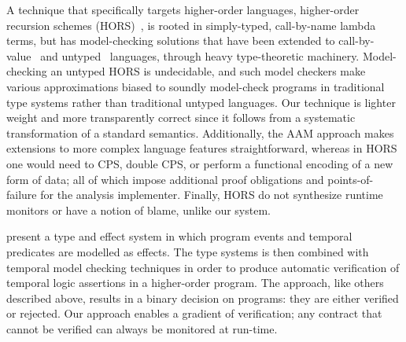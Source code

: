 A technique that specifically targets higher-order languages, higher-order recursion schemes (HORS)~\citep{ianjohnson:Knapik:2002:HPT:646794.704852}, is rooted in simply-typed, call-by-name lambda terms, but has model-checking solutions that have been extended to call-by-value~\citep{ianjohnson:DBLP:journals/jacm/Kobayashi13} and untyped~\citep{dvanhorn:Tsukada2010Untyped} languages, through heavy type-theoretic machinery.
%
Model-checking an untyped HORS is undecidable, and such model checkers make various approximations biased to soundly model-check programs in traditional type systems rather than traditional untyped languages.
%
Our technique is lighter weight and more transparently correct since it follows from a systematic transformation of a standard semantics.
%
Additionally, the AAM approach makes extensions to more complex language features straightforward, whereas in HORS one would need to CPS, double CPS, or perform a functional encoding of a new form of data; all of which impose additional proof obligations and points-of-failure for the analysis implementer.
%
Finally, HORS do not synthesize runtime monitors or have a notion of blame, unlike our system.

\citet{dvanhorn:Skalka-Smith-VanHorn:JFP08} present a type and effect system in which program events and temporal predicates are modelled as effects.
The type systems is then combined with temporal model checking
techniques in order to produce automatic verification of temporal
logic assertions in a higher-order program.  The approach, like others
described above, results in a binary decision on programs: they are
either verified or rejected.  Our approach enables a gradient of
verification; any contract that cannot be verified can always be
monitored at run-time.

